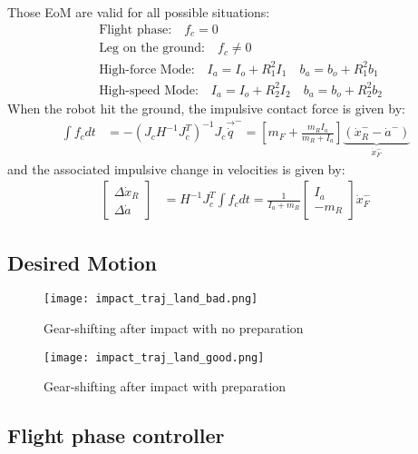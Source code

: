 %
Those EoM are valid for all possible situations:
%
\begin{align}
&\text{Flight phase:} \quad f_c = 0 \\
&\text{Leg on the ground:} \quad f_c \neq 0 \\
&\text{High-force Mode:} \quad I_a = I_o + R_1^2 I_1 \quad b_a = b_o + R_1^2 b_1 \\
&\text{High-speed Mode:} \quad I_a = I_o + R_2^2 I_2 \quad b_a = b_o + R_2^2 b_2
\end{align}
%
When the robot hit the ground, the impulsive contact force is given by:
%
\begin{align}
\int{  f_c dt } &= - \left( J_c H^{-1} J_c^T \right)^{-1}  J_c \vec{\dot{q}}^- =
\left[ m_F + \frac{m_R I_a}{m_R + I_a} \right] \underbrace{(\dot{x}_R^- - \dot{a}^-)}_{\dot{x}_F^-}
\label{eq:dsdm_impact_force}
\end{align}
%
and the associated impulsive change in velocities is given by:
%
\begin{align}
\left[ \begin{array}{c}
\Delta \dot{x}_R \\ \Delta \dot{a}
\end{array} \right]
 &= H^{-1} J_c^T \int{  f_c dt } = \frac{1}{I_a + m_R} \left[ \begin{array}{c}
I_a \\ -m_R
\end{array} \right] \dot{x}_F^-
\label{eq:dsdm_impact_delta}
\end{align}
%

\newpage

\subsection{Desired Motion}


\begin{figure}[H]
	\centering
		\texttt{[image: impact\_traj\_land\_bad.png]}
	\caption{Gear-shifting after impact with no preparation}
	\label{fig:fixed_bad_impact}
\end{figure}


\begin{figure}[H]
	\centering
		\texttt{[image: impact\_traj\_land\_good.png]}
	\caption{Gear-shifting after impact with preparation}
	\label{fig:fixed_bad_impact}
\end{figure}



\subsection{Flight phase controller}

